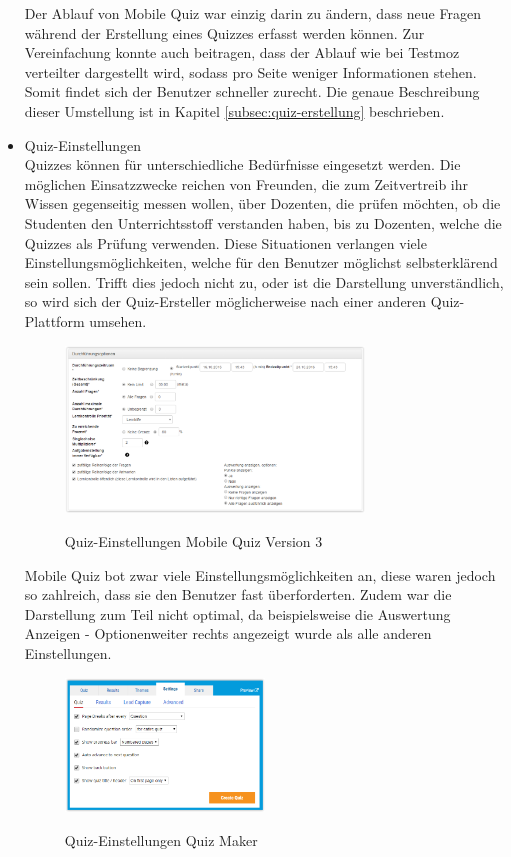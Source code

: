 \begin{itemize}
		Der Ablauf von Mobile Quiz war einzig darin zu ändern, dass neue Fragen während der Erstellung eines Quizzes erfasst werden können. Zur Vereinfachung konnte auch beitragen, dass der Ablauf wie bei Testmoz \cite{testmoz.com} verteilter dargestellt wird, sodass pro Seite weniger Informationen stehen. Somit findet sich der Benutzer schneller zurecht. Die genaue Beschreibung dieser Umstellung ist in Kapitel \ref{subsec:quiz-erstellung} beschrieben.
		
		
		
		
		\item  Quiz-Einstellungen \\
		Quizzes können für unterschiedliche Bedürfnisse eingesetzt werden. Die möglichen Einsatzzwecke reichen von Freunden, die zum Zeitvertreib ihr Wissen gegenseitig messen wollen, über Dozenten, die prüfen möchten, ob die Studenten den Unterrichtsstoff verstanden haben, bis zu Dozenten, welche die Quizzes als Prüfung verwenden.
		Diese Situationen verlangen viele Einstellungsmöglichkeiten, welche für den Benutzer möglichst selbsterklärend sein sollen. Trifft dies jedoch nicht zu, oder ist die Darstellung unverständlich, so wird sich der Quiz-Ersteller möglicherweise nach einer anderen Quiz-Plattform umsehen.
		
		\begin{figure}[H]
			\centering
			\includegraphics[width=0.75\textwidth
			]{Images/MobileQuiz_Quiz-Settings.PNG}
			\caption{Quiz-Einstellungen Mobile Quiz Version 3}
			\cite{mobilequiz.ch}
		\end{figure}
		
		
		Mobile Quiz bot zwar viele Einstellungsmöglichkeiten an, diese waren jedoch so zahlreich, dass sie den Benutzer fast überforderten. Zudem war die Darstellung zum Teil nicht optimal, da beispielsweise die \glqq Auswertung Anzeigen - Optionen\grqq weiter rechts angezeigt wurde als alle anderen Einstellungen.
		
		\begin{figure}[H]
			\centering
			\includegraphics[width=0.5\textwidth
			]{Images/QuizMaker_Quiz-Settings.PNG}
			\caption{Quiz-Einstellungen Quiz Maker}
			\cite{quiz-maker}
		\end{figure}
		

\end{itemize}
